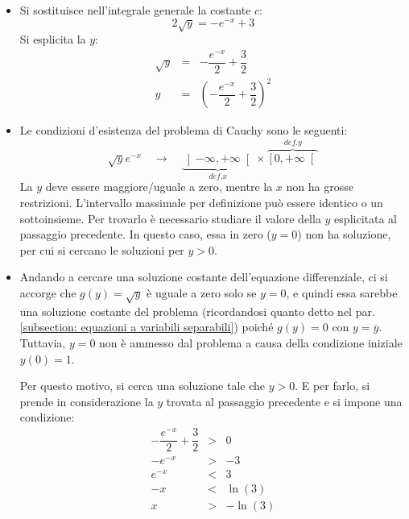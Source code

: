 \documentclass[a4paper]{article}
\begin{document}
	\begin{itemize}
		\item Si sostituisce nell'integrale generale la costante $c$:
		\begin{equation*}
			2\sqrt{y} = -e^{-x} + 3
		\end{equation*}
		Si esplicita la $y$:
		\begin{equation*}
			\begin{array}{rcl}
				\sqrt{y} &=& -\dfrac{e^{-x}}{2} + \dfrac{3}{2} \\ [.5em]
				y &=& \left(-\dfrac{e^{-x}}{2} + \dfrac{3}{2}\right)^{2}
			\end{array}
		\end{equation*}

		\item Le condizioni d'esistenza del problema di Cauchy sono le seguenti:
		\begin{equation*}
			\sqrt{y}e^{-x} \hspace{1em} \longrightarrow \hspace{1em} \underbrace{\left]-\infty, +\infty\right[}_{def. x} \times \overbrace{\left[0, +\infty \right[}^{def. y}
		\end{equation*}
		La $y$ deve essere maggiore/uguale a zero, mentre la $x$ non ha grosse restrizioni. L'intervallo massimale per definizione può essere identico o un sottoinsieme. Per trovarlo è necessario studiare il valore della $y$ esplicitata al passaggio precedente. In questo caso, essa in zero ($y=0$) non ha soluzione, per cui si cercano le soluzioni per $y > 0$.

		\item Andando a cercare una soluzione costante dell'equazione differenziale, ci si accorge che $g\left(y\right) = \sqrt{y}$ è uguale a zero solo se $y = 0$, e quindi essa sarebbe una soluzione costante del problema (ricordandosi quanto detto nel par. \ref{subsection: equazioni a variabili separabili}) poiché $g\left(y\right) = 0$ con $y = \overline{y}$. Tuttavia, $y = 0$ non è ammesso dal problema a causa della condizione iniziale $y\left(0\right) = 1$. 
		
		Per questo motivo, si cerca una soluzione tale che $y > 0$. E per farlo, si prende in considerazione la $y$ trovata al passaggio precedente e si impone una condizione:
		\begin{equation*}
			\begin{array}{rcl}
				-\dfrac{e^{-x}}{2} + \dfrac{3}{2} &>& 0 \\ [1em]
				-e^{-x} &>& -3 \\ [.3em]
				e^{-x} &<& 3 \\ [.3em]
				-x &<& \ln\left(3\right) \\ [.3em]
				x &>& -\ln\left(3\right)
			\end{array}
		\end{equation*}


\end{itemize}
\end{document}
